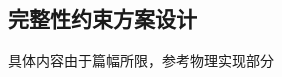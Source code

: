 \documentclass[11pt,a4paper]{article}
\renewcommand{\_}{\origunderscore\allowbreak}
\begin{document}
\subsection{完整性约束方案设计}

具体内容由于篇幅所限，参考物理实现部分~~~




\end{document}
